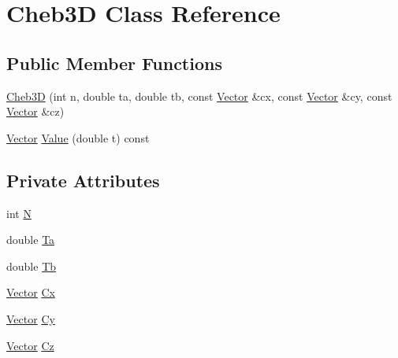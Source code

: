 \hypertarget{classCheb3D}{\section{Cheb3\-D Class Reference}
\label{classCheb3D}
}
\subsection*{Public Member Functions}
\begin{DoxyCompactItemize}
\item 
\hyperlink{classCheb3D_a09292e9d8a1ed6d8564f01b36027e21d}{Cheb3\-D} (int n, double ta, double tb, const \hyperlink{classVector}{Vector} \&cx, const \hyperlink{classVector}{Vector} \&cy, const \hyperlink{classVector}{Vector} \&cz)
\item 
\hyperlink{classVector}{Vector} \hyperlink{classCheb3D_a9a9d73e0e3338fa9dca1a4e87685fd83}{Value} (double t) const 
\end{DoxyCompactItemize}
\subsection*{Private Attributes}
\begin{DoxyCompactItemize}
\item 
int \hyperlink{classCheb3D_a2a426a463243e6b20cce4efa20ec58da}{N}
\item 
double \hyperlink{classCheb3D_ab9a5aef68534791393ee45105082d4c4}{Ta}
\item 
double \hyperlink{classCheb3D_accd9bd76537f3fdbc85a3946d7e25d6e}{Tb}
\item 
\hyperlink{classVector}{Vector} \hyperlink{classCheb3D_ad7fa118c22a924320f2b4ad57ed7a94c}{Cx}
\item 
\hyperlink{classVector}{Vector} \hyperlink{classCheb3D_ae3cbac1721d9f6f68ed855081eab5b0d}{Cy}
\item 
\hyperlink{classVector}{Vector} \hyperlink{classCheb3D_a8fb249e4c2db1a5122102bd02edd10cc}{Cz}
\end{DoxyCompactItemize}


